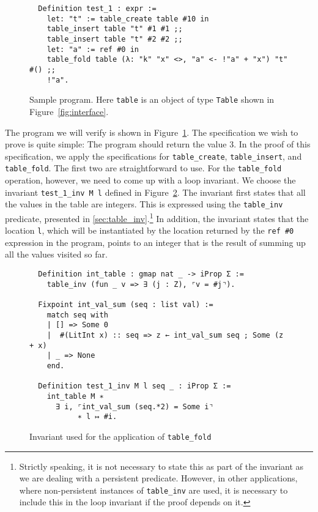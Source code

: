 \documentclass[10pt,a4paper]{article}
\begin{document}
\begin{figure}
\begin{verbatim}
  Definition test_1 : expr :=
    let: "t" := table_create table #10 in
    table_insert table "t" #1 #1 ;;
    table_insert table "t" #2 #2 ;;
    let: "a" := ref #0 in      
    table_fold table (λ: "k" "x" <>, "a" <- !"a" + "x") "t" #() ;;
    !"a".
\end{verbatim}
\caption{Sample program. Here \texttt{table} is an object of type \texttt{Table} shown in Figure~\ref{fig:interface}.}
\label{fig:test1}
\end{figure}

The program we will verify is shown in Figure~\ref{fig:test1}. The specification we wish to prove is quite simple: The program should return the value 3. In the proof of this specification, we apply the specifications for \texttt{table\_create}, \texttt{table\_insert}, and \texttt{table\_fold}. The first two are straightforward to use. For the \texttt{table\_fold} operation, however, we need to come up with a loop invariant. We choose the invariant \texttt{test\_1\_inv M l} defined in Figure~\ref{fig:test1_inv}. The invariant first states that all the values in the table are integers. This is expressed using the \texttt{table\_inv} predicate, presented in \ref{sec:table_inv}.\footnote{Strictly speaking, it is not necessary to state this as part of the invariant as we are dealing with a persistent predicate. However, in other applications, where non-persistent instances of \texttt{table\_inv} are used, it is necessary to include this in the loop invariant if the proof depends on it.} In addition, the invariant states that the location \texttt{l}, which will be instantiated by the location returned by the \texttt{ref \#0} expression in the program, points to an integer that is the result of summing up all the values visited so far.
\begin{figure}
\begin{verbatim}
  Definition int_table : gmap nat _ -> iProp Σ :=
    table_inv (fun _ v => ∃ (j : Z), ⌜v = #j⌝).
    
  Fixpoint int_val_sum (seq : list val) :=
    match seq with
    | [] => Some 0
    |  #(LitInt x) :: seq => z ← int_val_sum seq ; Some (z + x)
    | _ => None
    end.

  Definition test_1_inv M l seq _ : iProp Σ :=
    int_table M ∗
      ∃ i, ⌜int_val_sum (seq.*2) = Some i⌝
           ∗ l ↦ #i.
\end{verbatim}
\caption{Invariant used for the application of \texttt{table\_fold}}
\label{fig:test1_inv}
\end{figure}
\end{document}
